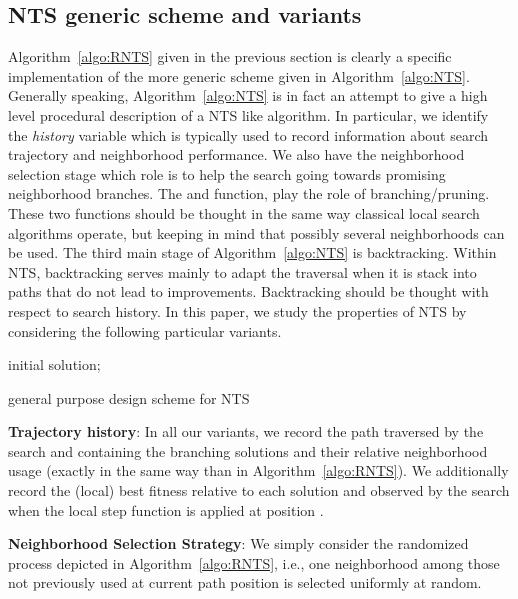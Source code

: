 \documentclass{acm_proc_article-sp}
\begin{document}
\subsection{NTS generic scheme and variants}
Algorithm~\ref{algo:RNTS} given in the previous section is clearly a specific implementation of the more generic scheme given in Algorithm~\ref{algo:NTS}. Generally speaking, Algorithm~\ref{algo:NTS} is in fact an attempt to give a high level procedural description of a NTS like algorithm. In particular, we identify the \emph{history} variable which is typically used to record information about search trajectory and neighborhood performance. We also have the neighborhood selection stage which role is to help the search going towards promising neighborhood branches. The  and  function, play the role of branching/pruning. These two functions should be thought in the same way classical local search algorithms operate, but keeping in mind that possibly several neighborhoods can be used. The third main stage of Algorithm~\ref{algo:NTS} is backtracking. Within NTS, backtracking serves mainly to adapt the traversal when it is stack into paths that do not lead to improvements. Backtracking should be thought with respect to search history. In this paper, we study the properties of NTS by considering the following particular variants.

\begin{algorithm}
 initial solution; \; 




\caption{general purpose design scheme for NTS}
\label{algo:NTS}
\end{algorithm}

\textbf{Trajectory history}: In all our variants, we record the path traversed by the search and containing the branching solutions and their relative neighborhood usage (exactly in the same way than in Algorithm~\ref{algo:RNTS}). We additionally record the (local) best fitness  relative to each solution  and observed by the search when the local step function  is applied at position .

\textbf{Neighborhood Selection Strategy}: We simply consider the randomized process depicted in Algorithm~\ref{algo:RNTS}, i.e., one neighborhood among those not previously used at current path position is selected uniformly at random.
\end{document}
